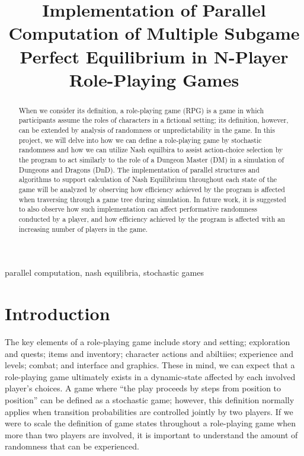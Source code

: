 \documentclass[conference]{IEEEtran}
\begin{document}
\title{Implementation of Parallel Computation of Multiple Subgame Perfect Equilibrium in N-Player Role-Playing Games\\}

\author{
}

\maketitle

\begin{abstract}
When we consider its definition, a role-playing game (RPG) is a game in which participants assume the roles of characters in a fictional setting; its definition, however, can be extended by analysis of randomness or unpredictability in the game. In this project, we will delve into how we can define a role-playing game by stochastic randomness and how we can utilize Nash equilbira to assist action-choice selection by the program to act similarly to the role of a Dungeon Master (DM) in a simulation of Dungeons and Dragons (DnD). The implementation of parallel structures and algorithms to support calculation of Nash Equilibrium throughout each state of the game will be analyzed by observing how efficiency achieved by the program is affected when traversing through a game tree during simulation. In future work, it is suggested to also observe how such implementation can affect performative randomness conducted by a player, and how efficiency achieved by the program is affected with an increasing number of players in the game.
\end{abstract}

\begin{IEEEkeywords}
parallel computation, nash equilibria, stochastic games
\end{IEEEkeywords}

\section{Introduction}
The key elements of a role-playing game include story and setting; exploration and quests; items and inventory; character actions and abiltiies; experience and levels; combat; and interface and graphics. These in mind, we can expect that a role-playing game ultimately exists in a dynamic-state affected by each involved player's choices. A game where ``the play proceeds by steps from position to position'' can be defined as a stochastic game; however, this definition normally applies when transition probabilities are controlled jointly by two players. If we were to scale the definition of game states throughout a role-playing game when more than two players are involved, it is important to understand the amount of randomness that can be experienced. 
\end{document}
